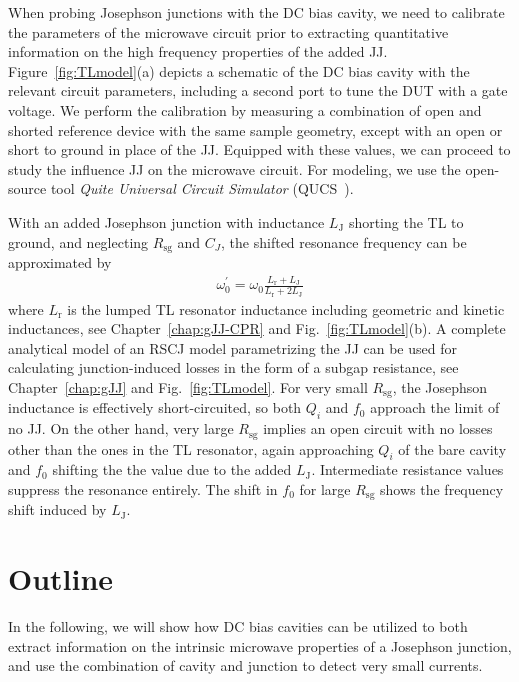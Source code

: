 When probing Josephson junctions with the DC bias cavity, we need to calibrate the parameters of the microwave circuit prior to extracting quantitative information on the high frequency properties of the added JJ.
%
Figure~\ref{fig:TLmodel}(a) depicts a schematic of the DC bias cavity with the relevant circuit parameters, including a second port to tune the DUT with a gate voltage.
%
We perform the calibration by measuring a combination of open and shorted reference device with the same sample geometry, except with an open or short to ground in place of the JJ.
%
Equipped with these values, we can proceed to study the influence JJ on the microwave circuit.
%
For modeling, we use the open-source tool \textit{Quite Universal Circuit Simulator} (QUCS~\cite{QucsProjectQuite}).




With an added Josephson junction with inductance $L_\text{J}$ shorting the TL to ground, and neglecting $R_\text{sg}$ and $C_{J}$, the shifted resonance frequency can be approximated by
%
\begin{align}
\omega_0^\prime = \omega_0\frac{L_\text{r}+L_\text{J}}{L_\text{r}+2L_\text{J}}
\label{eq:intro-omega0p}
\end{align}
%
where $L_\text{r}$ is the lumped TL resonator inductance including geometric and kinetic inductances, see Chapter~\ref{chap:gJJ-CPR} and Fig.~\ref{fig:TLmodel}(b).
%
A complete analytical model of an RSCJ model parametrizing the JJ can be used for calculating junction-induced losses in the form of a subgap resistance, see Chapter~\ref{chap:gJJ} and Fig.~\ref{fig:TLmodel}.
%
For very small $R_\text{sg}$, the Josephson inductance is effectively short-circuited, so both $Q_i$ and $f_0$ approach the limit of no JJ.
%
On the other hand, very large $R_\text{sg}$ implies an open circuit with no losses other than the ones in the TL resonator, again approaching $Q_i$ of the bare cavity and $f_0$ shifting the the value due to the added $L_\text{J}$.
%
Intermediate resistance values suppress the resonance entirely.
%
The shift in $f_0$ for large $R_\text{sg}$ shows the frequency shift induced by $L_\text{J}$.



\section{Outline}

In the following, we will show how DC bias cavities can be utilized to both extract information on the intrinsic microwave properties of a Josephson junction, and use the combination of cavity and junction to detect very small currents.

